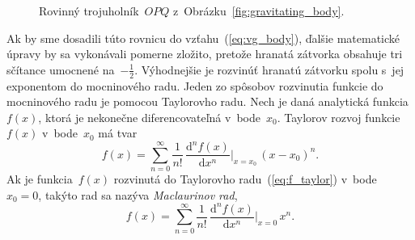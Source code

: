 \documentclass[a4paper,12pt]{book}
\newcommand{\diff}{\mathrm d}
\begin{document}
\begin{figure}
\centering

\caption{Rovinný trojuholník~$OPQ$ z~Obrázku~\ref{fig:gravitating_body}.}
\label{fig:distance_l}
\end{figure}

Ak by sme dosadili túto rovnicu do vzťahu~(\ref{eq:vg_body}), ďalšie
matematické úpravy by sa vykonávali pomerne zložito, pretože hranatá zátvorka
obsahuje tri sčítance umocnené na~$-\frac{1}{2}$.  Výhodnejšie je rozvinúť
hranatú zátvorku spolu s~jej exponentom do mocninového radu.  Jeden zo spôsobov
rozvinutia funkcie do mocninového radu je pomocou Taylorovho radu.  Nech je 
daná analytická funkcia~$f(x)$, ktorá je nekonečne diferencovateľná 
v~bode~$x_0$.  Taylorov rozvoj funkcie~$f(x)$ v~bode~$x_0$ má tvar
%
\begin{equation}
\label{eq:f_taylor}
f(x) = \sum_{n = 0}^\infty \frac{1}{n!} \, \frac{\diff^n f(x)}{\diff x^n} 
\bigg\lvert_{x = x_0} \, (x - x_0)^n{.}
\end{equation}
%
Ak je funkcia~$f(x)$ rozvinutá do Taylorovho radu~(\ref{eq:f_taylor}) 
v~bode~$x_0 = 0$, takýto rad sa nazýva \emph{Maclaurinov rad},
%
\begin{equation}
f(x) = \sum_{n = 0}^\infty \frac{1}{n!} \, \frac{\diff^n f(x)}{\diff x^n} 
\bigg\lvert_{x = 0} \, x^n{.}
\end{equation}
\end{document}
